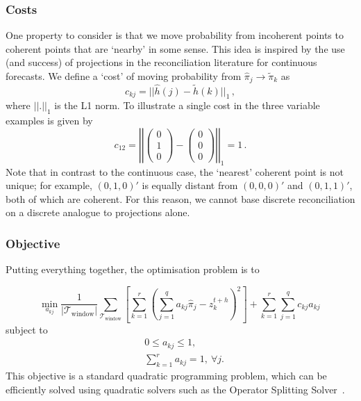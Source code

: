 \documentclass[a4paper,review,12pt,authoryear]{elsarticle}
\begin{document}
    \subsubsection*{\textbf{Costs}}
    One property to consider is that we move probability from incoherent points to coherent points that are  `nearby' in some sense. 
    This idea is inspired by the use (and success) of projections in the reconciliation literature for continuous forecasts. 
    We define a `cost' of moving probability from $\hat{\pi}_j\rightarrow\tilde{\pi}_k$ as
    \[
    c_{kj}=||\hat{h}(j)-\tilde{h}(k)||_1\,,
    \]
    where $||.||_1$ is the L1 norm. To illustrate a single cost in the three variable examples is given by
    \[
    c_{12}=\left|\left|\begin{pmatrix}0\\1\\0\end{pmatrix}-\begin{pmatrix}0\\0\\0\end{pmatrix}\right|\right|_1=1\,.
    \]
    Note that in contrast to the continuous case, the `nearest' coherent point is not unique; for example, $(0,1,0)'$ is equally distant from $(0,0,0)'$ and $(0,1,1)'$, both of which are coherent. For this reason, we cannot base discrete reconciliation on a discrete analogue to projections alone.

    
    \subsubsection*{\textbf{Objective}}

    Putting everything together, the optimisation problem is to 
    
    \[
    \underset{a_{kj}}{\min} \frac{1}{|\mathcal{T}_{\textrm{window}}|}\sum\limits_{\mathcal{T}_{\textrm{window}}}\left[\sum\limits_{k=1}^r\left(\sum\limits_{j=1}^q a_{kj}\hat{{\pi}}_j-z^{t+h}_k\right)^2\right] + \sum\limits_{k=1}^r\sum\limits_{j=1}^q c_{kj}a_{kj}\,
    \]
    subject to
    \begin{align*}
    &0\leq a_{kj}\leq 1,\\
    &\sum\limits_{k=1}^r a_{kj} = 1,~\forall j.
    \end{align*}
    This objective is a standard quadratic programming problem, which can be efficiently solved using quadratic solvers such as the Operator Splitting Solver~\citep[OSQP,][]{stellatoOSQPOperatorSplitting2020}.  
\end{document}
